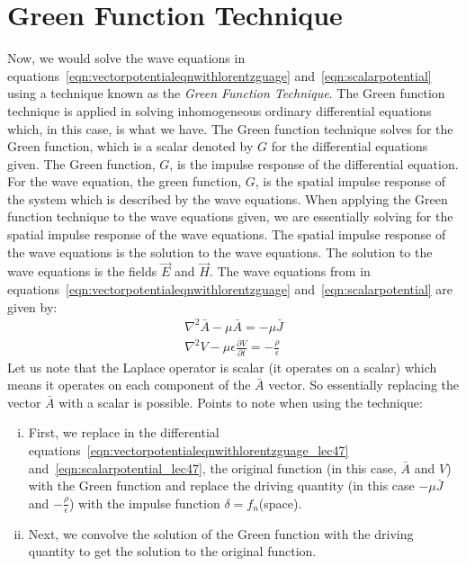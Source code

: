 \chapter{Green Function Technique}
Now, we would solve the wave equations in equations~\eqref{eqn:vectorpotentialeqnwithlorentzguage} and~\eqref{eqn:scalarpotential} using a technique known as the \emph{Green Function Technique}. The Green function technique is applied in solving inhomogeneous ordinary differential equations which, in this case, is what we have. The Green function technique solves for the Green function, which is a scalar denoted by $G$ for the differential equations given. The Green function, $G$, is the impulse response of the differential equation. For the wave equation, the green function, $G$, is the spatial impulse response of the system which is described by the wave equations. When applying the Green function technique to the wave equations given, we are essentially solving for the spatial impulse response of the wave equations. The spatial impulse response of the wave equations is the solution to the wave equations. The solution to the wave equations is the fields $\vec{E}$ and $\vec{H}$. The wave equations from in equations~\eqref{eqn:vectorpotentialeqnwithlorentzguage} and~\eqref{eqn:scalarpotential} are given by:
\begin{align}
\nabla^{2}\bar{A}-\mu\bar{A} = -\mu\bar{J}
\label{eqn:vectorpotentialeqnwithlorentzguage_lec47}\\
\nabla^{2}V-\mu\epsilon\frac{\partial V}{\partial t} = -\frac{\rho}{\epsilon}
\label{eqn:scalarpotential_lec47}
\end{align}
Let us note that the Laplace operator is scalar (it operates on a scalar) which means it operates on each component of the $\bar{A}$ vector. So essentially replacing the vector $\bar{A}$ with a scalar is possible.
Points to note when using the technique:
\begin{enumerate}[(i)]
\item First, we replace in the differential equations~\eqref{eqn:vectorpotentialeqnwithlorentzguage_lec47} and~\eqref{eqn:scalarpotential_lec47}, the original function (in this case, $\bar{A}$ and $V$) with the Green function and replace the driving quantity (in this case $-\mu\bar{J}$ and $-\frac{\rho}{\epsilon}$) with the impulse function $\delta = f_{n}$(space).
\item Next, we convolve the solution of the Green function with the driving quantity to get the solution to the original function.
\end{enumerate}

